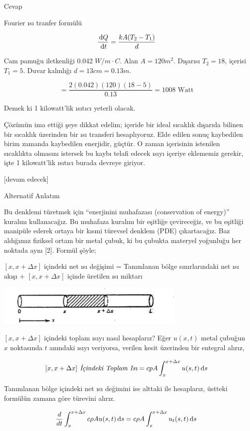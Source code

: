 \documentclass[12pt,fleqn]{article}\usepackage{../../common}
\begin{document}
Cevap

Fourier ısı tranfer formülü

$$
\frac{\,\mathrm{d} Q}{\,\mathrm{d} t} = \frac{k A (T_2 - T_1)}{d}
$$

Cam pamuğu iletkenliği 0.042 $W / m \cdot C$. Alan $A = 120 m^2$. Dışarısı $T_2
= 18$, içerisi $T_1 = 5$. Duvar kalınlığı $d = 13 cm = 0.13 m$.

$$
= \frac{2 (0.042) (120) (18-5)}{0.13} = 1008 \textrm{ Watt}
$$

Demek ki 1 kilowatt'lik ısıtıcı yeterli olacak.

Çözümün ima ettiği şeye dikkat edelim; içeride bir ideal sıcaklık dışarıda
bilinen bir sıcaklık üzerinden bir ısı transferi hesaplıyoruz. Elde edilen sonuç
kaybedilen birim zamanda kaybedilen enerjidir, güçtür. O zaman içerisinin
istenilen sıcaklıkta olmasını istersek bu kaybı telafi edecek ısıyı içeriye
eklememiz gerekir, işte 1 kilowatt'lik ısıtıcı burada devreye giriyor.


[devam edecek]

Alternatif Anlatım

Bu denklemi türetmek için ``enerjinini muhafazası (conservation of
energy)'' kuralını kullanacağız. Bu muhafaza kuralını bir eşitliğe
çevireceğiz, ve bu eşitliği manipüle ederek ortaya bir kısmi türevsel
denklem (PDE) çıkartacağız. Baz aldığımız fiziksel ortam bir metal çubuk,
ki bu çubukta materyel yoğunluğu her noktada aynı [2].  Formül şöyle;

$[x,x+\Delta x]$ içindeki net ısı değişimi = Tanımlanan bölge
sınırlarındaki net ısı akışı + $[x,x+\Delta x]$ içinde üretilen ısı miktarı

\includegraphics[height=2cm]{heat_1.png}

$[x,x+\Delta x]$ içindeki toplam ısıyı nasıl hesaplarız? Eğer $u(x,t)$
metal çubuğun $x$ noktasında $t$ anındaki ısıyı veriyorsa, verilen kesit
üzerinden bir entegral alırız,

$$
[x,x+\Delta x] \textit{ İçindeki Toplam Isı} = 
cpA \int _{ x}^{x+\Delta x}u(s,t) \,\mathrm{d} s
$$

Tanımlanan bölge içindeki net ısı değimini ise alttaki ile hesaplarız,
üstteki formülün zamana göre türevini alırız. 

$$
\frac{d}{dt} \int _{ x}^{x+\Delta x} c\rho A u(s,t) \,\mathrm{d} s = 
c\rho A  \int _{ x}^{x+\Delta x} u_t(s,t) \,\mathrm{d} s
$$
\end{document}
